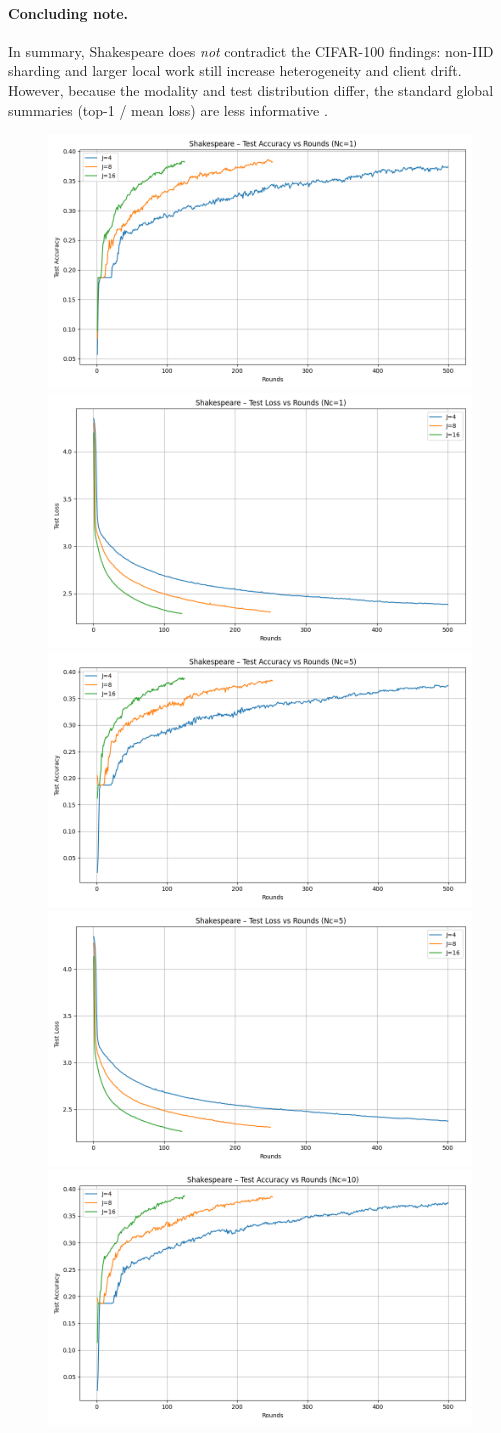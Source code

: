\documentclass[10pt,twocolumn,letterpaper]{article}
\begin{document}
\paragraph{Concluding note.}
In summary, Shakespeare does \emph{not} contradict the CIFAR-100 findings: non-IID sharding and larger local work still increase heterogeneity and client drift. However, because the modality and test distribution differ, the standard global summaries (top-1 / mean loss) are less informative .


\begin{figure}[H]
    \centering
    \includegraphics[width=0.45\linewidth]{shak_figs/shakespeare_acc_vs_rounds_1.png}
    \includegraphics[width=0.45\linewidth]{shak_figs/shakespeare_loss_vs_rounds_1.png}
    \includegraphics[width=0.45\linewidth]{shak_figs/shakespeare_acc_vs_rounds_5.png}
    \includegraphics[width=0.45\linewidth]{shak_figs/shakespeare_loss_vs_rounds_5.png}
    \includegraphics[width=0.45\linewidth]{shak_figs/shakespeare_acc_vs_rounds_10.png}

\end{figure}
\end{document}
